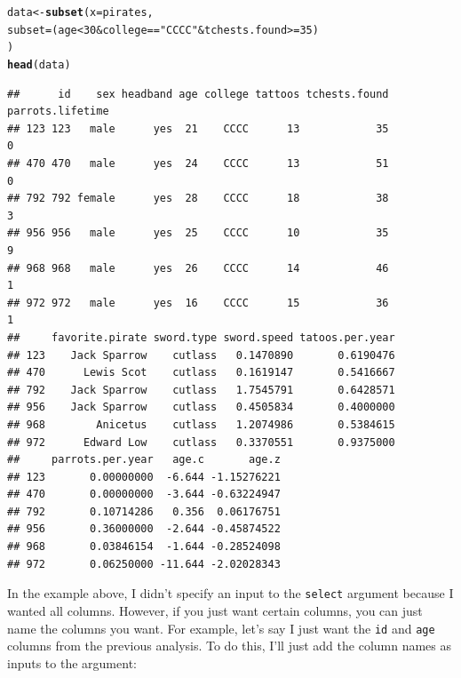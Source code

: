 \documentclass{tufte-book}\usepackage[]{graphicx}\usepackage[]{color}
\makeatletter
\newcommand{\hlnum}[1]{\textcolor[rgb]{0.686,0.059,0.569}{#1}}%
\newcommand{\hlstr}[1]{\textcolor[rgb]{0.192,0.494,0.8}{#1}}%
\newcommand{\hlopt}[1]{\textcolor[rgb]{0,0,0}{#1}}%
\newcommand{\hlstd}[1]{\textcolor[rgb]{0.345,0.345,0.345}{#1}}%
\newcommand{\hlkwb}[1]{\textcolor[rgb]{0.69,0.353,0.396}{#1}}%
\newcommand{\hlkwc}[1]{\textcolor[rgb]{0.333,0.667,0.333}{#1}}%
\newcommand{\hlkwd}[1]{\textcolor[rgb]{0.737,0.353,0.396}{\textbf{#1}}}%
\newenvironment{kframe}{%
 \def\at@end@of@kframe{}%
 \ifinner\ifhmode%
  \def\at@end@of@kframe{\end{minipage}}%
  \begin{minipage}{\columnwidth}%
 \fi\fi%
 \def\FrameCommand##1{\hskip\@totalleftmargin \hskip-\fboxsep
 \colorbox{shadecolor}{##1}\hskip-\fboxsep
     \hskip-\linewidth \hskip-\@totalleftmargin \hskip\columnwidth}%
 \MakeFramed {\advance\hsize-\width
   \@totalleftmargin\z@ \linewidth\hsize
   \@setminipage}}%
 {\par\unskip\endMakeFramed%
 \at@end@of@kframe}
\newenvironment{knitrout}{}{} %
\makeatother
\begin{document}
\begin{footnotesize}
\begin{footnotesize}
\begin{knitrout}
\color{fgcolor}\begin{kframe}
\begin{alltt}
\hlstd{data} \hlkwb{<-} \hlkwd{subset}\hlstd{(}\hlkwc{x} \hlstd{= pirates,}
               \hlkwc{subset} \hlstd{= (age} \hlopt{<} \hlnum{30} \hlopt{&} \hlstd{college} \hlopt{==} \hlstr{"CCCC"} \hlopt{&} \hlstd{tchests.found} \hlopt{>=} \hlnum{35}\hlstd{)}
               \hlstd{)}
\hlkwd{head}\hlstd{(data)}
\end{alltt}
\begin{verbatim}
##      id    sex headband age college tattoos tchests.found parrots.lifetime
## 123 123   male      yes  21    CCCC      13            35                0
## 470 470   male      yes  24    CCCC      13            51                0
## 792 792 female      yes  28    CCCC      18            38                3
## 956 956   male      yes  25    CCCC      10            35                9
## 968 968   male      yes  26    CCCC      14            46                1
## 972 972   male      yes  16    CCCC      15            36                1
##     favorite.pirate sword.type sword.speed tatoos.per.year
## 123    Jack Sparrow    cutlass   0.1470890       0.6190476
## 470      Lewis Scot    cutlass   0.1619147       0.5416667
## 792    Jack Sparrow    cutlass   1.7545791       0.6428571
## 956    Jack Sparrow    cutlass   0.4505834       0.4000000
## 968        Anicetus    cutlass   1.2074986       0.5384615
## 972      Edward Low    cutlass   0.3370551       0.9375000
##     parrots.per.year   age.c       age.z
## 123       0.00000000  -6.644 -1.15276221
## 470       0.00000000  -3.644 -0.63224947
## 792       0.10714286   0.356  0.06176751
## 956       0.36000000  -2.644 -0.45874522
## 968       0.03846154  -1.644 -0.28524098
## 972       0.06250000 -11.644 -2.02028343
\end{verbatim}
\end{kframe}
\end{knitrout}
\end{footnotesize}

In the example above, I didn't specify an input to the \texttt{select} argument because I wanted all columns. However, if you just want certain columns, you can just name the columns you want. For example, let's say I just want the \texttt{id} and \texttt{age} columns from the previous analysis. To do this, I'll just add the column names as inputs to the  argument:
 

\end{footnotesize}
\end{document}
